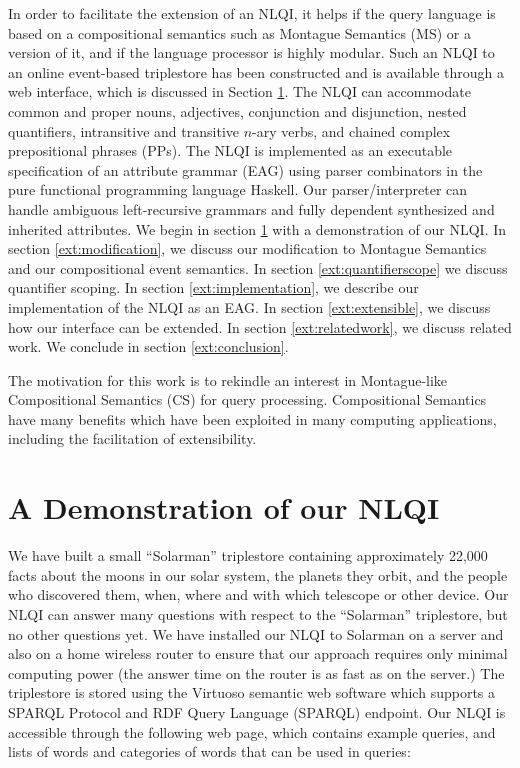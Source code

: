 \documentclass[../main.tex]{subfiles}
\begin{document}
\begin{refsection}
In order to facilitate the extension of an NLQI, it helps if the query language is based on a compositional
semantics such as Montague Semantics (MS) \cite{Dowty:wall} or a version of it, and if the language processor is highly
modular. Such an NLQI to an online event-based triplestore has been constructed and is available
through a web interface, which is discussed in Section \ref{ext:demonstration}. The NLQI can accommodate common and
proper nouns, adjectives, conjunction and disjunction, nested quantifiers, intransitive and transitive $n$-ary verbs, and chained complex prepositional phrases (PPs). The NLQI is implemented as an executable
specification of an attribute grammar (EAG) using parser combinators in the pure functional programming
language Haskell.
Our parser/interpreter can handle ambiguous left-recursive grammars and fully dependent synthesized
and inherited attributes.
We begin in section \ref{ext:demonstration} with a demonstration of our NLQI. In section \ref{ext:modification}, we discuss our modification to
Montague Semantics and our compositional event semantics. In section \ref{ext:quantifierscope} we discuss quantifier scoping. In section \ref{ext:implementation}, we describe our implementation
of the NLQI as an EAG. In section \ref{ext:extensible}, we discuss how our interface can be extended. In section \ref{ext:relatedwork}, we discuss related work. We conclude in section \ref{ext:conclusion}.

The motivation for this work is to rekindle an interest in Montague-like Compositional Semantics (CS) for query processing. Compositional Semantics have many benefits which have been exploited in many computing applications, including the facilitation of extensibility.

\section{A Demonstration of our NLQI}
\label{ext:demonstration}
We have built a small ``Solarman'' triplestore containing approximately 22,000 facts about the moons in
our solar system, the planets they orbit, and the people who discovered them, when, where and with
which telescope or other device. Our NLQI can answer many questions with respect to the ``Solarman'' triplestore, but no other questions yet. We
have installed our NLQI to Solarman on a server and also on a home wireless router to ensure that our
approach requires only minimal computing power (the answer time on the router is as fast as on the
server.) The triplestore is stored using the Virtuoso semantic web software which supports a SPARQL Protocol and RDF Query Language (SPARQL)
endpoint. Our NLQI is accessible through the following web page, which contains example queries, and
lists of words and categories of words that can be used in queries:


\end{refsection}
\end{document}
